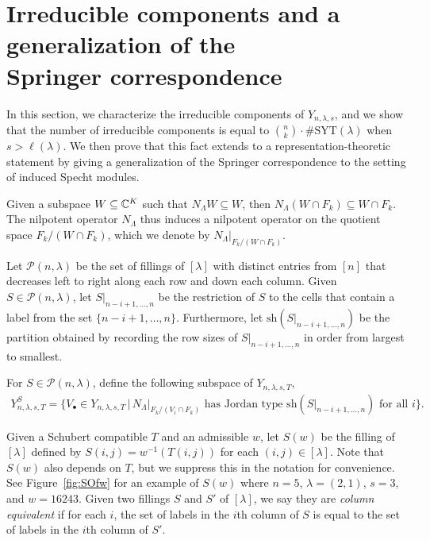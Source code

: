 \documentclass[12pt]{amsart}
\newcommand{\st}{\,|\,}
\newcommand{\la}{\lambda}
\newcommand{\SYT}{\mathrm{SYT}}
\begin{document}
\section{Irreducible components and a generalization of the \\Springer correspondence}\label{sec:IrreducibleComponents}


In this section, we characterize the irreducible components of $Y_{n,\la,s}$, and we show that the number of irreducible components is equal to $\binom{n}{k}\cdot\#\SYT(\la)$ when $s>\ell(\la)$. We then prove that this fact extends to a representation-theoretic statement by giving a generalization of the Springer correspondence to the setting of induced Specht modules.


Given a subspace $W\subseteq \mathbb{C}^K$ such that $N_\Lambda W\subseteq W$, then $N_\Lambda(W\cap F_k)\subseteq W\cap F_k$. The nilpotent operator $N_\Lambda$ thus induces a nilpotent operator on the quotient space $F_k/(W\cap F_k)$, which we denote by $N_\Lambda|_{F_k/(W\cap F_k)}$.

Let $\mathcal{P}(n,\lambda)$ be the set of fillings of $[\lambda]$ with distinct entries from $[n]$ that decreases left to right along each row and down each column. Given $S\in \mathcal{P}(n,\la)$, let $S|_{n-i+1,\dots,n}$ be the restriction of $S$ to the cells that contain a label from the set $\{n-i+1,\dots,n\}$. Furthermore, let $\mathrm{sh}(S|_{n-i+1,\dots, n})$ be the partition obtained by recording the row sizes of $S|_{n-i+1,\dots, n}$ in order from largest to smallest. 

For $S\in \mathcal{P}(n,\la)$, define the following subspace of $Y_{n,\la,s,T}$,
\begin{align}
Y_{n,\la,s,T}^{S} = \{V_\bullet \in Y_{n,\la,s,T} \st N_\Lambda|_{F_k/(V_i\cap F_k)}\text{ has Jordan type }\mathrm{sh}(S|_{n-i+1,\dots,n})\text{ for all }i\}.
\end{align}

Given a Schubert compatible $T$ and an admissible $w$, let $S(w)$ be the filling of $[\la]$ defined by $S(i,j) = w^{-1}(T(i,j))$ for each $(i,j)\in [\la]$. Note that $S(w)$ also depends on $T$, but we suppress this in the notation for convenience. See Figure~\ref{fig:SOfw} for an example of $S(w)$ where $n=5$, $\la = (2,1)$, $s=3$, and $w=16243$. Given two fillings $S$ and $S'$ of $[\la]$, we say they are \emph{column equivalent} if for each $i$, the set of labels in the $i$th column of $S$ is equal to the set of labels in the $i$th column of $S'$.
\end{document}
